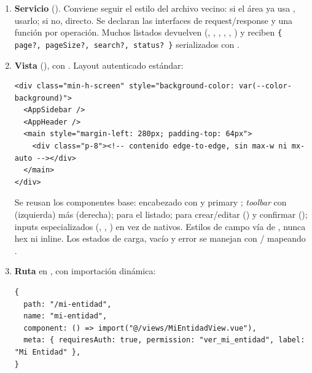 \begin{enumerate}
\item \textbf{Servicio} (\allowbreak {}\allowbreak {}\allowbreak {}). Conviene seguir el estilo del archivo vecino: si el área ya usa , usarlo; si no,  directo. Se declaran las interfaces de request/response y una función por operación. Muchos listados devuelven  (, , , , , ) y reciben \texttt{\{ page?, pageSize?, search?, status? \}} serializados con .

\item \textbf{Vista} (\allowbreak {}\allowbreak {}\allowbreak {}), con . Layout autenticado estándar:

\begin{lstlisting}[numbers=none]
<div class="min-h-screen" style="background-color: var(--color-background)">
  <AppSidebar />
  <AppHeader />
  <main style="margin-left: 280px; padding-top: 64px">
    <div class="p-8"><!-- contenido edge-to-edge, sin max-w ni mx-auto --></div>
  </main>
</div>
\end{lstlisting}

Se reusan los componentes base: encabezado con  y  primary ; \emph{toolbar} con  (izquierda) más  (derecha);  para el listado;  para crear/editar () y confirmar (); inputs especializados (, , ) en vez de nativos. Estilos de campo vía  de , nunca hex ni  inline. Los estados de carga, vacío y error se manejan con / mapeando .

\item \textbf{Ruta} en \allowbreak {}\allowbreak {}\allowbreak {}, con importación dinámica:

\begin{lstlisting}[numbers=none]
{
  path: "/mi-entidad",
  name: "mi-entidad",
  component: () => import("@/views/MiEntidadView.vue"),
  meta: { requiresAuth: true, permission: "ver_mi_entidad", label: "Mi Entidad" },
}
\end{lstlisting}


\end{enumerate}
